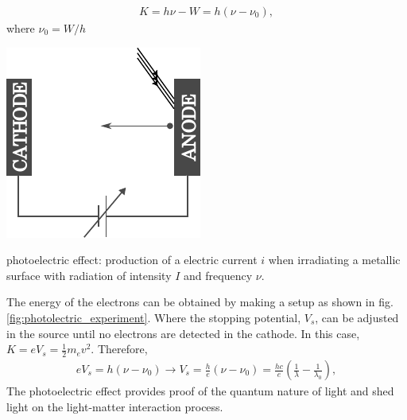 \documentclass{article}
\begin{document}
 \begin{align}\label{eq:kenergy_photoelectric}
  K = h\nu-W=h(\nu-\nu_0),
\end{align}
where $\nu_0=W/h$
\begin{marginfigure}%
  \includegraphics[width=\linewidth]{figures/photo_experiment.pdf}
  \caption{photoelectric effect: production of a electric current $i$ when irradiating a metallic surface with radiation of intensity $I$ and frequency $\nu$.}
  \label{fig:photolectric_experiment}
\end{marginfigure}
The energy of the electrons can be obtained by making a setup as shown in fig. \ref{fig:photolectric_experiment}. Where the stopping potential, $V_s$, can be adjusted in the source until no electrons are detected in the cathode. In this case, $K=eV_s=\frac{1}{2}m_ev^2$. Therefore,
\begin{align}\label{eq:stoping_pot_photoelectric}
  eV_s = h(\nu-\nu_0)\longrightarrow V_s=\frac{h}{e}(\nu-\nu_0)=\frac{hc}{e}\left(\frac{1}{\lambda}-\frac{1}{\lambda_0}\right),
\end{align}
The photoelectric effect provides proof of the quantum nature of light and shed light on the light-matter interaction process.

\newpage
\end{document}
